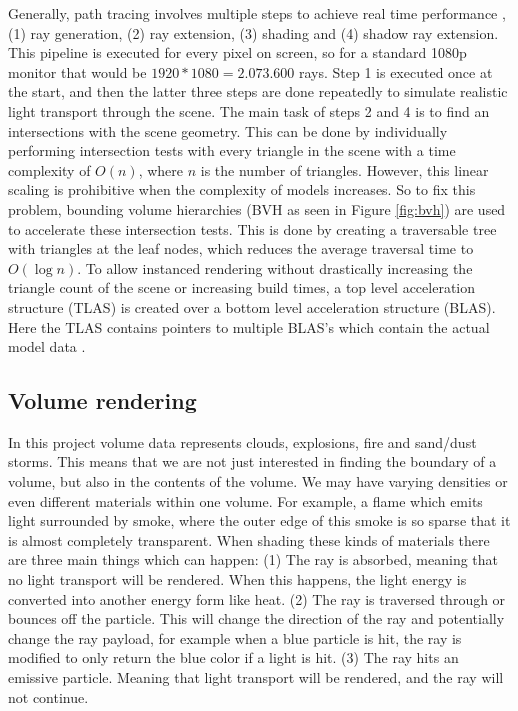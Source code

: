 Generally, path tracing involves multiple steps to achieve real time performance \cite{laine2013megakernels}, (1) ray generation, (2) ray extension, (3) shading and (4) shadow ray extension. This pipeline is executed for every pixel on screen, so for a standard 1080p monitor that would be $1920*1080=2.073.600$ rays. Step 1 is executed once at the start, and then the latter three steps are done repeatedly to simulate realistic light transport through the scene. The main task of steps 2 and 4 is to find an intersections with the scene geometry. This can be done by individually performing intersection tests with every triangle in the scene with a time complexity of $O(n)$, where $n$ is the number of triangles. However, this linear scaling is prohibitive when the complexity of models increases. So to fix this problem, bounding volume hierarchies (BVH as seen in Figure \ref{fig:bvh}) are used to accelerate these intersection tests. This is done by creating a traversable tree with triangles at the leaf nodes, which reduces the average traversal time to  $O(\log n)$. To allow instanced rendering without drastically increasing the triangle count of the scene or increasing build times, a top level acceleration structure (TLAS) is created over a bottom level acceleration structure (BLAS). Here the TLAS contains pointers to multiple BLAS's which contain the actual model data \cite{VulkanAccelerationStructures}. 

\subsection{Volume rendering} \label{INTRO:volumes}
In this project volume data represents clouds, explosions, fire and sand/dust storms. This means that we are not just interested in finding the boundary of a volume, but also in the contents of the volume. We may have varying densities or even different materials within one volume. For example, a flame which emits light surrounded by smoke, where the outer edge of this smoke is so sparse that it is almost completely transparent. When shading these kinds of materials there are three main things which can happen: (1) The ray is absorbed, meaning that no light transport will be rendered. When this happens, the light energy is converted into another energy form like heat. (2) The ray is traversed through or bounces off the particle. This will change the direction of the ray and potentially change the ray payload, for example when a blue particle is hit, the ray is modified to only return the blue color if a light is hit. (3) The ray hits an emissive particle. Meaning that light transport will be rendered, and the ray will not continue.

